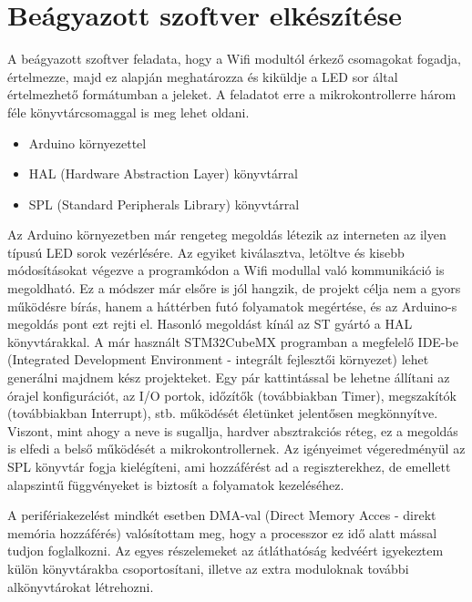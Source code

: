 \documentclass[../main.tex]{subfiles}
\begin{document}
\section{Beágyazott szoftver elkészítése}
        A beágyazott szoftver feladata, hogy a Wifi modultól érkező csomagokat fogadja, értelmezze, majd ez alapján meghatározza és kiküldje a LED sor által értelmezhető formátumban a jeleket. A feladatot erre a mikrokontrollerre három féle könyvtárcsomaggal is meg lehet oldani. 
        
        \begin{itemize}
            \item Arduino környezettel
            \item HAL (Hardware Abstraction Layer) könyvtárral
            \item SPL (Standard Peripherals Library) könyvtárral
        \end{itemize}
        
        Az Arduino környezetben már rengeteg megoldás létezik az interneten az ilyen típusú LED sorok vezérlésére. Az egyiket kiválasztva, letöltve és kisebb módosításokat végezve a programkódon a Wifi modullal való kommunikáció is megoldható. Ez a módszer már elsőre is jól hangzik, de projekt célja nem a gyors működésre bírás, hanem a háttérben futó folyamatok megértése, és az Arduino-s megoldás pont ezt rejti el. Hasonló megoldást kínál az ST gyártó a HAL könyvtárakkal. A már használt STM32CubeMX programban a megfelelő IDE-be (Integrated Development Environment - integrált fejlesztői környezet) lehet generálni majdnem kész projekteket. Egy pár kattintással be lehetne állítani az órajel konfigurációt, az I/O portok, időzítők (továbbiakban Timer), megszakítók (továbbiakban Interrupt), stb. működését életünket jelentősen megkönnyítve. Viszont, mint ahogy a neve is sugallja, hardver absztrakciós réteg, ez a megoldás is elfedi a belső működését a mikrokontrollernek. Az igényeimet végeredményül az SPL könyvtár fogja kielégíteni, ami hozzáférést ad a regiszterekhez, de emellett alapszintű függvényeket is biztosít a folyamatok kezeléséhez. \cite{hal_spl1}\cite{hal_spl2}
        
        A perifériakezelést mindkét esetben DMA-val (Direct Memory Acces - direkt memória hozzáférés) valósítottam meg, hogy a processzor ez idő alatt mással tudjon foglalkozni. Az egyes részelemeket az átláthatóság kedvéért igyekeztem külön könyvtárakba csoportosítani, illetve az extra moduloknak további alkönyvtárokat létrehozni. 
        
\end{document}
